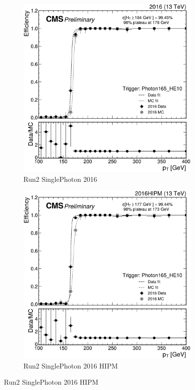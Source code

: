 \begin{figure}
	\centering
	\begin{subfigure}{.45\textwidth}
		\includegraphics[width=\linewidth]{Images/pdfs/16_SinglePhoton_efficiency_withratio_and_fits.pdf}
		\caption{Run2 SinglePhoton 2016}
		\label{fig:HT_eff_SinglePhoton_16}
	\end{subfigure}
	\begin{subfigure}{.45\textwidth}
		\includegraphics[width=\linewidth]{Images/pdfs/16-APV-HIPM_SinglePhoton_efficiency_withratio_and_fits.pdf}
		\caption{Run2 SinglePhoton 2016 HIPM}
		\label{fig:HT_eff_SinglePhoton_16_HIPM}
	\end{subfigure}


\end{figure}
